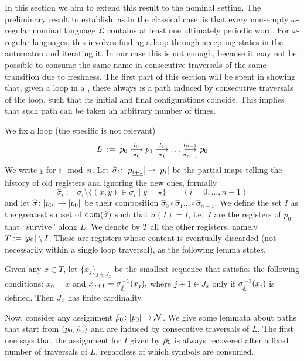 In this section we aim to extend this result to the nominal setting. The preliminary result to establish, as in the classical case, is that every non-empty $\omega$-regular nominal language $\mathcal{L}$ contains at least one ultimately periodic word. For $\omega$-regular languages, this involves finding a loop through accepting states in the automaton and iterating it. In our case this is not enough, because it may not be possible to consume the same name in consecutive traversals of the same transition due to freshness. The first part of this section will be spent in showing that, given a loop in a \hdma{}, there always is a path induced by consecutive traversals of the loop, such that its initial and final configurations coincide. This implies that such path can be taken an arbitrary number of times.

We fix a loop (the specific \hdma{} is not relevant)
\[
	L \;:=\; p_0 \overset{l_0}{\underset{\sigma_0}{\longrightarrow}} p_1 \overset{l_1}{\underset{\sigma_1}{\longrightarrow}} \dots \overset{l_{n-1}}{\underset{\sigma_{n-1}}{\longrightarrow}} p_0
\]
We write ${\underline{i}}$ for $i \mod n$. Let $\widehat{\sigma}_i \colon |p_{\underline{i+1}}| \rightharpoonup |p_i|$ be the partial maps telling the history of old registers and ignoring the new ones, formally
\[
	\widehat{\sigma}_i := \sigma_i \setminus \{ (x,y) \in \sigma_i \mid y = \star \} 
	\qquad (i=0,\dots,n-1)
\]
and let $\widehat{\sigma} \colon |p_0| \rightharpoonup |p_0|$ be their composition $\widehat{\sigma}_0 \circ \widehat{\sigma}_1 \dots \circ \widehat{\sigma}_{n-1}$. We define the set $I$ as the greatest subset of $\operatorname{dom}(\widehat{\sigma})$ such that $ \widehat{\sigma}(I) = I$,
i.e.\ $I$ are the registers of $p_0$ that ``survive'' along $L$. We denote by $T$ all the other registers, namely $T := |p_0| \setminus I$. These are registers whose content is eventually discarded (not necessarily within a single loop traversal), as the following lemma states.
%
%
\begin{lemma}
\label{lem:rho-forget}
Given any $x \in T$, let $\{x_j\}_{j \in J_x}$ be the smallest sequence that satisfies the following conditions:
$
	x_0 = x
$
and
$
	x_{j+1} = \sigma_{{\underline{j}}}^{-1}(x_j),
$
where $j+1 \in J_x$ only if $\sigma_{{\underline{j}}}^{-1}(x_i)$ is defined. Then $J_x$ has finite cardinality.
\end{lemma}
%
Now, consider any assignment $\hat{\rho}_0 \colon |p_0| \to \mathcal{N}$. We give some lemmata about paths that start from $(p_0,\hat{\rho}_0)$ and are induced by consecutive traversals of $L$. The first one says that the assignment for $I$ given by $\hat{\rho}_0$ is always recovered after a fixed number of traversals of $L$, regardless of which symbols are consumed.
